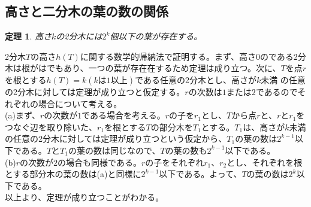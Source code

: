 \documentclass[twocolumn]{jarticle}
\newtheorem{tem}{定理}
\begin{document}
\subsection{高さと二分木の葉の数の関係}
\begin{tem}高さ$k$の2分木には$2^k$個以下の葉が存在する。\end{tem}
\indent 2分木$T$の高さ$h(T)$に関する数学的帰納法で証明する。まず、高さ$0$のである2分木は根がはでもあり、一つの葉が存在在するため定理は成り立つ。次に、$T$を点$r$を根とする$h(T)=k (kは1以上)$である任意の2分木とし、高さが$k$未満
の任意の2分木に対しては定理が成り立つと仮定する。$r$の次数は$1$または$2$であるのでそれぞれの場合について考える。\\
\indent (a)まず、$r$の次数が$1$である場合を考える。$r$の子を$r_1$とし、$T$から点$r$と、$r$と$r_1$をつなぐ辺を取り除いた、$r_1$を根とする$T$の部分木を$T_1$とする。$T_1$は、高さが$k$未満
の任意の2分木に対しては定理が成り立つという仮定から、$T_1$の葉の数は$2^{k-1}$以下である。$T$と$T_1$の葉の数は同じなので、$T$の葉の数も$2^{k-1}$以下である。\\
\indent (b)$r$の次数が$2$の場合も同様である。$r$の子をそれぞれ$r_1$、$r_2$とし、それぞれを根とする部分木の葉の数は(a)と同様に$2^{k-1}$以下である。よって、$T$の葉の数は$2^k$以下である。
\\以上より、定理が成り立つことがわかる。\\
\end{document}
